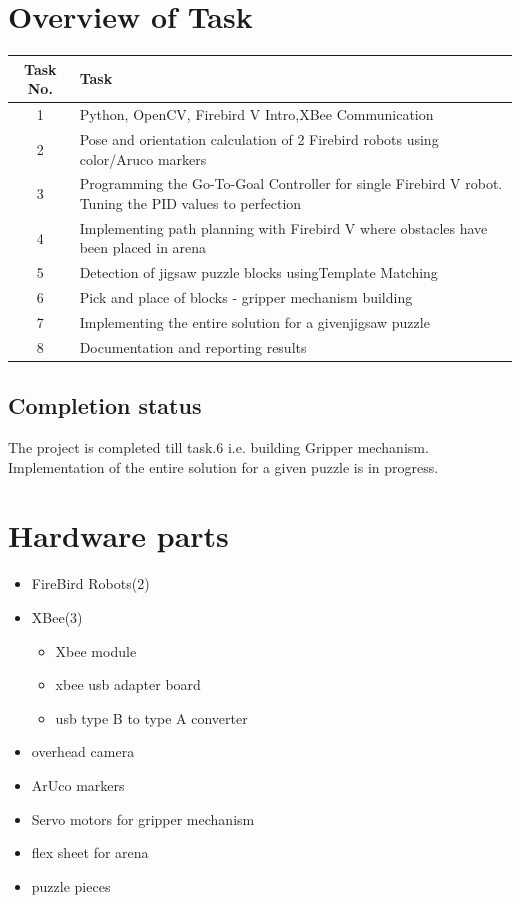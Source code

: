\documentclass[a4paper,12pt,oneside]{book}
\begin{document}
\section*{Overview of Task}
\begin{tabular}{| c | p{27 em} | }\hline
		\textbf{Task No.} & \hspace{7em}\textbf{Task}\\\hline
		1 &\small{ Python, OpenCV, Firebird V Intro,XBee Communication} \\\hline
		2 &\small{ Pose and orientation calculation of 2 Firebird robots using\hspace{3 em} color/Aruco markers }\\\hline
		3 &\small{ Programming the Go-To-Goal Controller for single Firebird V robot. Tuning the PID\hspace{0 em} values to perfection }\\\hline
		4 &\small{ Implementing path planning with Firebird V where obstacles have been placed in arena }\\\hline
		5 &\small{ Detection of jigsaw puzzle blocks using\hspace{0 em}Template Matching}\\\hline
		6 &\small{ Pick and place of blocks - gripper mechanism building }\\\hline
		7 &\small{ Implementing the entire solution for a given\hspace{0 em}jigsaw puzzle }\\\hline
		8 &\small{ Documentation and reporting results }\\\hline
	\end{tabular}

\subsection*{Completion status}
The project is completed till task$.$6  i.e. building Gripper mechanism. Implementation of the entire solution for a given puzzle is in progress.  

\section{Hardware parts}
\begin{itemize}
  \item FireBird Robots(2)
  \item  XBee(3)
  \begin{itemize}
  \item Xbee module
  \item xbee usb adapter board
  \item usb type B to type A converter
  \end{itemize}
   \item overhead camera
   \item ArUco markers
   \item Servo motors for gripper mechanism
   \item flex sheet for arena
   \item puzzle pieces
\end{itemize}
\end{document}
